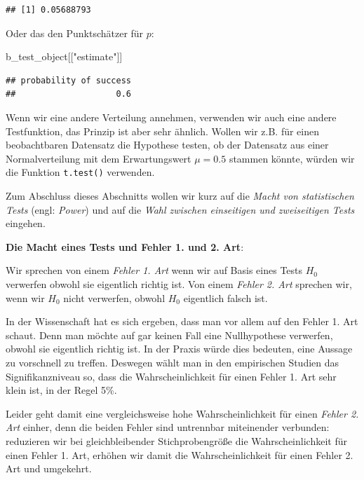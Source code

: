 \documentclass[]{book}
\newenvironment{Shaded}{\begin{snugshade}}{\end{snugshade}}
\newcommand{\StringTok}[1]{\textcolor[rgb]{0.31,0.60,0.02}{#1}}
\newcommand{\NormalTok}[1]{#1}
\begin{document}
\begin{verbatim}
## [1] 0.05688793
\end{verbatim}

Oder das den Punktschätzer für \(p\):

\begin{Shaded}
\begin{Highlighting}[]
\NormalTok{b_test_object[[}\StringTok{"estimate"}\NormalTok{]]}
\end{Highlighting}
\end{Shaded}

\begin{verbatim}
## probability of success 
##                    0.6
\end{verbatim}

Wenn wir eine andere Verteilung annehmen, verwenden wir auch eine andere
Testfunktion, das Prinzip ist aber sehr ähnlich. Wollen wir z.B. für
einen beobachtbaren Datensatz die Hypothese testen, ob der Datensatz aus
einer Normalverteilung mit dem Erwartungswert \(\mu=0.5\) stammen
könnte, würden wir die Funktion \texttt{t.test()} verwenden.

Zum Abschluss dieses Abschnitts wollen wir kurz auf die \emph{Macht von
statistischen Tests} (engl: \emph{Power}) und auf die \emph{Wahl
zwischen einseitigen und zweiseitigen Tests} eingehen.

\textbf{Die Macht eines Tests und Fehler 1. und 2. Art}:

Wir sprechen von einem \emph{Fehler 1. Art} wenn wir auf Basis eines
Tests \(H_0\) verwerfen obwohl sie eigentlich richtig ist. Von einem
\emph{Fehler 2. Art} sprechen wir, wenn wir \(H_0\) nicht verwerfen,
obwohl \(H_0\) eigentlich falsch ist.

In der Wissenschaft hat es sich ergeben, dass man vor allem auf den
Fehler 1. Art schaut. Denn man möchte auf gar keinen Fall eine
Nullhypothese verwerfen, obwohl sie eigentlich richtig ist. In der
Praxis würde dies bedeuten, eine Aussage zu vorschnell zu treffen.
Deswegen wählt man in den empirischen Studien das Signifikanzniveau so,
dass die Wahrscheinlichkeit für einen Fehler 1. Art sehr klein ist, in
der Regel 5\%.

Leider geht damit eine vergleichsweise hohe Wahrscheinlichkeit für einen
\emph{Fehler 2. Art} einher, denn die beiden Fehler sind untrennbar
miteinender verbunden: reduzieren wir bei gleichbleibender
Stichprobengröße die Wahrscheinlichkeit für einen Fehler 1. Art, erhöhen
wir damit die Wahrscheinlichkeit für einen Fehler 2. Art und umgekehrt.
\end{document}
